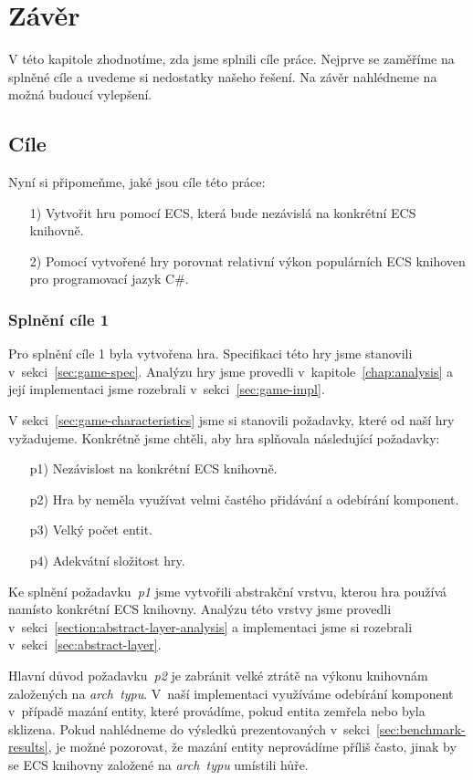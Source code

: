 \chapter{Závěr}
V této kapitole zhodnotíme, zda jsme splnili cíle práce. Nejprve se zaměříme na splněné cíle a uvedeme si nedostatky našeho řešení. Na závěr nahlédneme na možná budoucí vylepšení.

\section{Cíle}
Nyní si připomeňme, jaké jsou cíle této práce:

\begin{enumerate}
    \item[1)] Vytvořit hru pomocí ECS, která bude nezávislá na konkrétní ECS knihovně.
    \item[2)] Pomocí vytvořené hry porovnat relativní výkon populárních ECS knihoven pro programovací jazyk C\#.
\end{enumerate}

\subsection{Splnění cíle 1}
Pro splnění cíle 1 byla vytvořena hra. Specifikaci této hry jsme stanovili v~sekci~\ref{sec:game-spec}. Analýzu hry jsme provedli v~kapitole~\ref{chap:analysis} a její implementaci jsme rozebrali v~sekci~\ref{sec:game-impl}.

V sekci~\ref{sec:game-characteristics} jsme si stanovili požadavky, které od naší hry vyžadujeme. Konkrétně jsme chtěli, aby hra splňovala následující požadavky:

\begin{enumerate}
    \item[p1)] Nezávislost na konkrétní ECS knihovně.
    \item[p2)] Hra by neměla využívat velmi častého přidávání a odebírání komponent.
    \item[p3)] Velký počet entit.
    \item[p4)] Adekvátní složitost hry.
\end{enumerate}

Ke splnění požadavku~\textit{p1} jsme vytvořili abstrakční vrstvu, kterou hra používá namísto konkrétní ECS knihovny. Analýzu této vrstvy jsme provedli v~sekci~\ref{section:abstract-layer-analysis} a implementaci jsme si rozebrali v~sekci~\ref{sec:abstract-layer}.

Hlavní důvod požadavku~\textit{p2} je zabránit velké ztrátě na výkonu knihovnám založených na \textit{arch~typu}. V~naší implementaci využíváme odebírání komponent v~případě mazání entity, které provádíme, pokud entita zemřela nebo byla sklizena. Pokud nahlédneme do výsledků prezentovaných v~sekci~\ref{sec:benchmark-results}, je možné pozorovat, že mazání entity neprovádíme příliš často, jinak by se ECS knihovny založené na \textit{arch~typu} umístili hůře.

